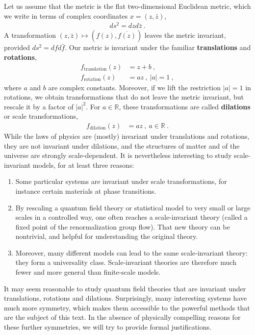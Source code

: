 \documentclass[12pt, a4paper, notitlepage, twoside]{report}
\numberwithin{equation}{section}
\theoremstyle{break}
\begin{document}
Let us assume that the metric is the flat two-dimensional Euclidean metric, which we write in terms of complex coordinates $x=(z,\bar{z})$,
\begin{align}
 ds^2 = dz d\bar{z} \ .
\end{align}
A transformation $(z,\bar{z}) \mapsto (f(z),\overline{f(z)})$ leaves the metric invariant, provided $ds^2 = dfd\bar{f}$.  
Our metric is invariant under the familiar \textbf{\boldmath translations} and \textbf{\boldmath rotations},
\begin{align}
f_\text{translation}(z) &= z+b \ ,
\\ 
f_\text{rotation}(z) &=a z \ , \ |a|=1\ ,
\end{align}
where $a$ and $b$ are complex constants.
Moreover, if we lift the restriction $|a|=1$ in rotations, we obtain transformations that do not leave the metric invariant, but rescale it by a factor of $|a|^2$.
For $a\in{\mathbb{R}}$, these transformations are called \textbf{\boldmath dilations} or scale transformations,
\begin{align}
 f_\text{dilation}(z) &= a z\ , \ a\in {\mathbb{R}}\ .
\end{align}
While the laws of physics are (mostly) invariant under translations and rotations, they are not invariant under dilations, and the structures of matter and of the universe are strongly scale-dependent.
It is nevertheless interesting to study scale-invariant models, for at least three reasons:
\begin{enumerate}
 \item Some particular systems are invariant under scale transformations, for instance certain materials at phase transitions.
 \item By rescaling a quantum field theory or statistical model to very small or large scales in a controlled way, one often reaches a scale-invariant theory (called a fixed point of the renormalization group flow).
That new theory can be nontrivial, and helpful for understanding the original theory.
\item Moreover, many different models can lead to the same scale-invariant theory: they form a universality class. Scale-invariant theories are therefore much fewer and more general than finite-scale models.
\end{enumerate}

It may seem reasonable to study quantum field theories that are invariant under translations, rotations and dilations. 
Surprisingly, many interesting systems have much more symmetry, which makes them accessible to the powerful methods that are the subject of this text.
In the absence of physically compelling reasons for these further symmetries, we will try to provide formal justifications.
\end{document}
